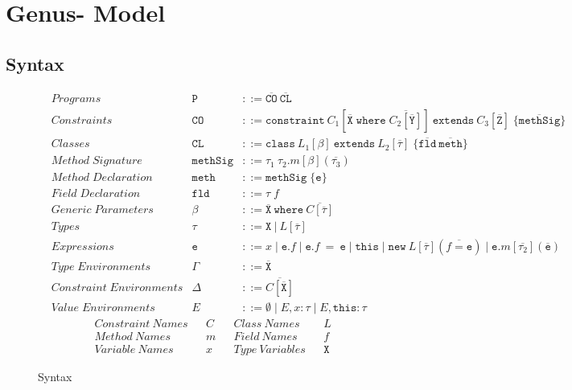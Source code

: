 \appendix
\chapter{Genus- Model} \label{appendix:genusminus}

\section{Syntax}

\begin{figure}[H]
    \centering
    \begin{align*}
        &Programs & \texttt{P} &::= \overline{\texttt{CO}} \: \overline{\texttt{CL}} \\
        &Constraints & \texttt{CO} &::= \texttt{constraint} \: C_1[\overline{\texttt{X}} \; \texttt{where} \; \overline{C_2[\overline{\texttt{Y}}]}] \: \texttt{extends} \: C_3[\overline{\texttt{Z}}] \; \{ \overline{\texttt{methSig}} \} \\
        &Classes & \texttt{CL} &::= \texttt{class} \: L_1[\beta] \: \texttt{extends} \: L_2[\overline{\tau}] \; \{ \overline{\texttt{fld}} \: \overline{\texttt{meth}} \} \\
        &Method \; Signature & \texttt{methSig} &::= \tau_1 \: \tau_2.m[\beta](\overline{\tau_3}) \\
        &Method \; Declaration & \texttt{meth} &::= \texttt{methSig} \; \{ \texttt{e}\} \\
        &Field \; Declaration & \texttt{fld} &::= \tau \; f \\
        &Generic \; Parameters & \beta &::= \overline{\texttt{X}} \: \texttt{where} \: \overline{C[\overline{\tau}]} \\
        &Types & \tau &::= \texttt{X} \: | \: L[\overline{\tau}] \\
        &Expressions & \texttt{e} &::= x \; | \; \texttt{e}.f \; | \; \texttt{e}.f \: = \: \texttt{e} \; | \; \texttt{this} \; | \; \texttt{new} \: L[\overline{\tau}]( \overline{f = \texttt{e}} ) \; | \; \texttt{e}.m[\overline{\tau_2}](\overline{\texttt{e}}) \\
        &Type \; Environments & \Gamma &::= \overline{\texttt{X}} \\
        &Constraint \; Environments & \Delta &::= \overline{C[\overline{\texttt{X}}]} \\
        &Value \; Environments & E &::= \emptyset \; | \; E, x : \tau \; | \; E, \texttt{this} : \tau 
    \end{align*}
    \begin{align*}
        &Constraint \: Names & &C & &Class \: Names & &L \\
        &Method \: Names & &m & &Field \: Names & &f \\
        &Variable \: Names & &x & &Type \: Variables & &\texttt{X}
    \end{align*}
    \caption{Syntax}
    \label{fig:G-Syntax}
\end{figure}
\newpage

